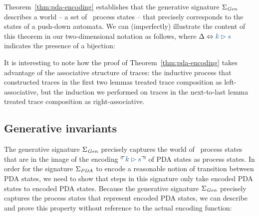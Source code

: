 Theorem~\ref{thm:pda-encoding} establishes that the generative
signature $\Sigma_{\it Gen}$ describes a world -- a set of
\sls~process states -- that precisely corresponds to the states of a
push-down automata.  We can (imperfectly) illustrate the content of
this theorem in our two-dimensional notation as follows, where 
$\Delta \Leftrightarrow \obj{k \rhd s}$ indicates the presence of a
bijection:
\begin{center}
\end{center}

It is interesting to note how the proof of
Theorem~\ref{thm:pda-encoding} takes advantage of the associative
structure of traces: the inductive process that constructed traces in
the first two lemmas treated trace composition as left-associative,
but the induction we performed on traces in the next-to-last lemma
treated trace composition as right-associative.

\subsection{Generative invariants}
\label{sec:sls-pda-preservation}

The generative signature $\Sigma_{\it Gen}$ precisely captures the
world of \sls~process states that are in the image of the encoding
$\ctxinterp{k \rhd s}$ of PDA states as process states. In order for
the signature $\Sigma_{\it PDA}$ to encode a reasonable notion of
transition between PDA states, we need to show that steps in this
signature only take encoded PDA states to encoded PDA states. Because 
the generative signature $\Sigma_{\it Gen}$ precisely captures the 
process states that represent encoded PDA states, we can describe
and prove this property without reference to the actual encoding function:
 

